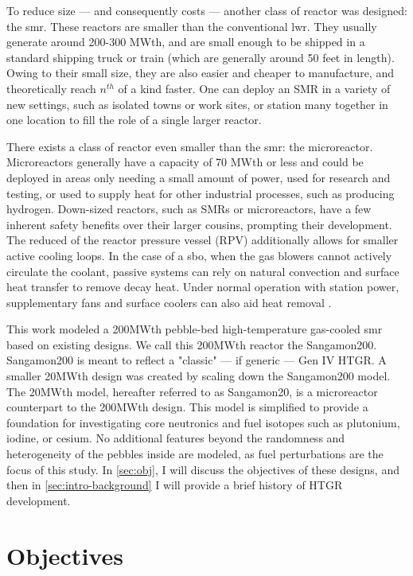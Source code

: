 To reduce size --- and consequently costs --- another class of reactor was designed: the \acrfull{smr}.  These reactors are smaller than the conventional \acrshort{lwr}.  They usually generate around 200-300 MWth, and are small enough to be shipped in a standard shipping truck or train (which are generally around 50 feet in length).  Owing to their small size, they are also easier and cheaper to manufacture, and theoretically reach $n^{th}$ of a kind faster.  One can deploy an SMR in a variety of new settings, such as isolated towns or work sites, or station many together in one location to fill the role of a single larger reactor.  

There exists a class of reactor even smaller than the \acrshort{smr}: the microreactor.  Microreactors generally have a capacity of 70 MWth or less and could be deployed in areas only needing a small amount of power, used for research and testing, or used to supply heat for other industrial processes, such as producing hydrogen.  Down-sized reactors, such as SMRs or microreactors, have a few inherent safety benefits over their larger cousins, prompting their development.  The reduced of the reactor pressure vessel (RPV) additionally allows for smaller active cooling loops.  In the case of a \acrfull{sbo}, when the gas blowers cannot actively circulate the coolant, passive systems can rely on natural convection and surface heat transfer to remove decay heat.  Under normal operation with station power, supplementary fans and surface coolers can also aid heat removal \cite{reutler_advantages_1984}.


This work modeled a 200MWth pebble-bed high-temperature gas-cooled \acrshort{smr} based on existing designs.  We call this 200MWth reactor the Sangamon200.  Sangamon200 is meant to reflect a "classic" --- if generic --- Gen IV HTGR.  A smaller 20MWth design was created by scaling down the Sangamon200 model.  The 20MWth model, hereafter referred to as Sangamon20, is a microreactor counterpart to the 200MWth design.  This model is simplified to provide a foundation for investigating core neutronics and fuel isotopes such as plutonium, iodine, or cesium. No additional features beyond the randomness and heterogeneity of the pebbles inside are modeled, as fuel perturbations are the focus of this study.  In \autoref{sec:obj}, I will discuss the objectives of these designs, and then in \autoref{sec:intro-background} I will provide a brief history of HTGR development.


\section{Objectives}
\label{sec:obj}

